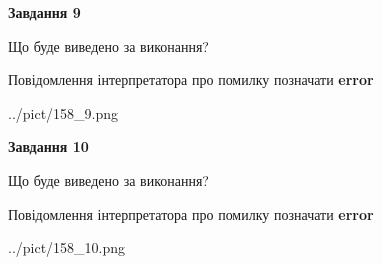 \documentclass[12pt, ukrainian]{article}
\begin{document}
{{\begin {center}\textbf{Завдання 9}\end {center}}\par
Що буде виведено за виконання? \par
Повідомлення інтерпретатора про помилку позначати \textbf{error}

\begin{center}
	{../pict/158_9.png}
\end{center}
\newpage

{\begin {center}\textbf{Завдання 10}\end {center}}\par
Що буде виведено за виконання? \par
Повідомлення інтерпретатора про помилку позначати \textbf{error}

\begin{center}
	{../pict/158_10.png}
\end{center}
\newpage

}
\end{document}
